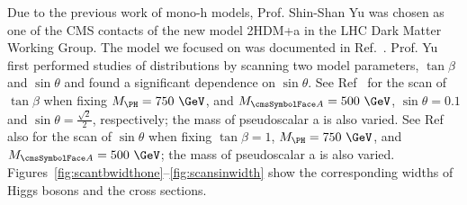 Due to the previous work of mono-h models, Prof. Shin-Shan Yu was chosen as one of the CMS contacts of the new model 2HDM+a in the LHC Dark Matter Working Group. The model we focused on was documented in Ref.~\cite{Bauer:2017ota}. Prof. Yu first performed studies of \MET 
distributions by scanning two model parameters, $\tan\beta$ and $\sin\theta$ and found a significant dependence on $\sin\theta$. See 
Ref~\cite{Eiko2HDMscantanb} for the scan of $\tan\beta$ when fixing $M_{\PH}=750~\GeV$, and $M_{\Az}=500~\GeV$, 
$\sin\theta=0.1$ and $\sin\theta=\frac{\sqrt{2}}{2}$, respectively; the mass of pseudoscalar a is also varied. 
See Ref~\cite{Eiko2HDMscansin} also for the scan of $\sin\theta$ when fixing $\tan\beta=1$, $M_{\PH}=750~\GeV$, and $M_{\Az}=500~\GeV$; 
the mass of pseudoscalar a is also varied. 
Figures~\ref{fig:scantbwidthone}--\ref{fig:scansinwidth} show the corresponding widths of Higgs bosons and 
the cross sections.

